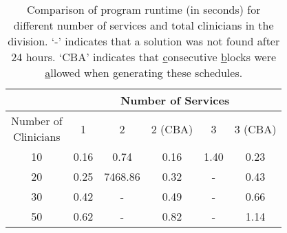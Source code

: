 \begin{table}[htbp]
	\centering
	\begin{tabular}{|c|c||c|c||c|c|}
		\hline
		                                      &  \multicolumn{5}{c|}{Number of Services}  \\ \hline
		\makecell[l]{Number of \\ Clinicians} &  1   &    2    & 2 (CBA) &  3   & 3 (CBA) \\ \hline
		                 10                   & 0.16 &  0.74   &  0.16   & 1.40 &  0.23   \\ \hline
		                 20                   & 0.25 & 7468.86 &  0.32   &  -   &  0.43   \\ \hline
		                 30                   & 0.42 &    -    &  0.49   &  -   &  0.66   \\ \hline
		                 50                   & 0.62 &    -    &  0.82   &  -   &  1.14   \\ \hline
	\end{tabular}
	\caption{Comparison of program runtime (in seconds) for different number of services and total clinicians in the division. `-' indicates that a solution was not found after 24 hours. `CBA' indicates that \underline{c}onsecutive \underline{b}locks were \underline{a}llowed when generating these schedules.}
	\label{tbl:runtime-services-clinicians-comparison}%
\end{table}
